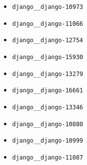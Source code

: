 \begin{multicols}{2}
\begin{itemize}
    \item \texttt{django\_\_django-10973}
    \item \texttt{django\_\_django-11066}
    \item \texttt{django\_\_django-12754}
    \item \texttt{django\_\_django-15930}
    \item \texttt{django\_\_django-13279}
    \item \texttt{django\_\_django-16661}
    \item \texttt{django\_\_django-13346}
    \item \texttt{django\_\_django-10880}
    \item \texttt{django\_\_django-10999}
    \item \texttt{django\_\_django-11087}
\end{itemize}
\end{multicols}